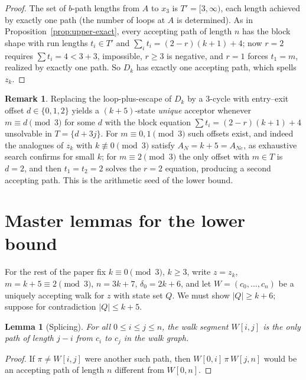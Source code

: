 \documentclass[11pt]{article}
\newtheorem{lemma}[theorem]{Lemma}
\theoremstyle{definition}
\newtheorem{remark}[theorem]{Remark}
\newcommand{\AN}{A_N}
\newcommand{\ANe}{A_{Ne}}
\begin{document}
\begin{proof}
The set of $b$-path lengths from $A$ to $x_3$ is $T'=[3,\infty)$, each length
achieved by exactly one path (the number of loops at $A$ is determined). As in
Proposition~\ref{prop:upper-exact}, every accepting path of length $n$ has the
block shape with run lengths $t_i\in T'$ and $\sum_i t_i=(2-r)(k+1)+4$; now
$r=2$ requires $\sum t_i=4<3+3$, impossible, $r\ge3$ is negative, and $r=1$
forces $t_1=m$, realized by exactly one path. So $D_k$ has exactly one
accepting path, which spells $z_k$.
\end{proof}

\begin{remark}\label{rem:why-mod3}
Replacing the loop-plus-escape of $D_k$ by a $3$-cycle with entry--exit offset
$d\in\{0,1,2\}$ yields a $(k+5)$-state \emph{unique} acceptor whenever
$m\equiv d\pmod 3$ for some $d$ with the block equation
$\sum t_i=(2-r)(k+1)+4$ unsolvable in $T=\{d+3j\}$. For $m\equiv0,1\pmod3$
such offsets exist, and indeed the analogues of $z_k$ with
$k\not\equiv0\pmod3$ satisfy $\AN=k+5=\ANe$, as exhaustive search
confirms for small $k$; for $m\equiv2\pmod 3$ the
only offset with $m\in T$ is $d=2$, and then $t_1=t_2=2$ solves the $r=2$
equation, producing a second accepting path. This is the arithmetic seed of
the lower bound.
\end{remark}

\section{Master lemmas for the lower bound}\label{sec:tools}

For the rest of the paper fix $k\equiv0\pmod3$, $k\ge3$, write $z=z_k$,
$m=k+5\equiv2\pmod3$, $n=3k+7$, $\delta_0=2k+6$, and let
$W=(c_0,\dots,c_n)$ be a uniquely accepting walk for $z$ with state set $Q$.
We must show $|Q|\ge k+6$; suppose for contradiction $|Q|\le k+5$.

\begin{lemma}[Splicing]\label{lem:splice}
For all $0\le i\le j\le n$, the walk segment $W[i,j]$ is the \emph{only} path
of length $j-i$ from $c_i$ to $c_j$ in the walk graph.
\end{lemma}

\begin{proof}
If $\pi\ne W[i,j]$ were another such path, then $W[0,i]\,\pi\,W[j,n]$ would be
an accepting path of length $n$ different from $W[0,n]$.
\end{proof}
\end{document}
